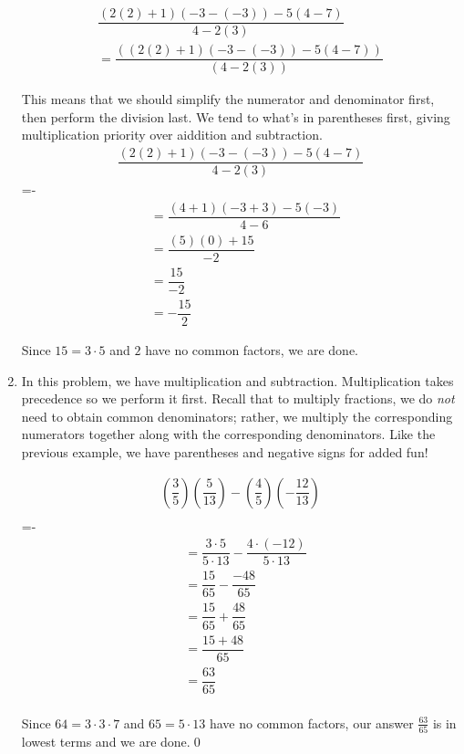 \begin{ex}
\begin{enumerate}
\begin{multline*}
\dfrac{(2(2)+1)(-3-(-3)) - 5(4-7)}{4-2(3)} \\
= \dfrac{\left((2(2)+1)(-3-(-3)) - 5(4-7) \right)}{(4-2(3))}
\end{multline*}

This means that we should simplify the numerator and denominator first, then perform the division last.  We tend to what's in parentheses first, giving multiplication priority over aiddition and subtraction.
\begin{multline*}
\dfrac{(2(2)+1)(-3-(-3)) - 5(4-7)}{4-2(3)}
\end{multline*}
\abovedisplayskip=-\medskipamount
\begin{align*}
&= \dfrac{(4+1)(-3+3)-5(-3)}{4 - 6} \\
&= \dfrac{(5)(0) + 15}{-2} \\
&= \dfrac{15}{-2} \\
&= -\dfrac{15}{2} \tag{Properties of Negatives}
\end{align*}

Since $15 = 3\cdot 5$ and $2$ have no common factors, we are done.
																			



\item  In this problem, we have multiplication and subtraction.  Multiplication takes precedence so we perform it first.  Recall that to multiply fractions, we do \textit{not} need to obtain common denominators;  rather, we multiply the corresponding numerators together along with the corresponding denominators.  Like the previous example, we have parentheses and negative signs for added fun!

\begin{multline*}
\left(\dfrac{3}{5} \right) \left(\dfrac{5}{13} \right) - \left(\dfrac{4}{5}\right) \left( - \dfrac{12}{13}\right)\\
\end{multline*}
\abovedisplayskip=-\bigskipamount
\begin{align*}
&= \dfrac{3 \cdot 5}{5 \cdot 13} - \dfrac{4\cdot (-12)}{5 \cdot 13} \tag{Multiply fractions}\\
&= \dfrac{15}{65} - \dfrac{-48}{65} \\
&= \dfrac{15}{65} + \dfrac{48}{65} \tag{Properties of Negatives}\\
&= \dfrac{15+48}{65}  \tag{Add numerators} \\
&= \dfrac{63}{65} \\
\end{align*}

Since $64 = 3 \cdot 3 \cdot 7$ and $65 = 5 \cdot 13$ have no common factors, our answer $\frac{63}{65}$ is in lowest terms and we are done.\qed

\end{enumerate}

\end{ex} 

